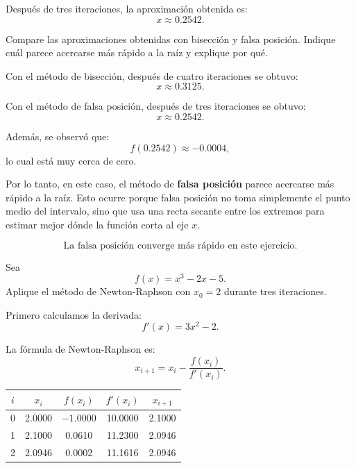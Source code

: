 \documentclass[11pt,respuestas,a4]{aleph-examen}
\begin{document}
\begin{preguntas}
\begin{respuesta}
Después de tres iteraciones, la aproximación obtenida es:
\[
\boxed{x\approx 0.2542}.
\]
\end{respuesta}


\item
Compare las aproximaciones obtenidas con bisección y falsa posición. Indique cuál parece acercarse más rápido a la raíz y explique por qué. 

\begin{respuesta}
Con el método de bisección, después de cuatro iteraciones se obtuvo:
\[
x\approx 0.3125.
\]

Con el método de falsa posición, después de tres iteraciones se obtuvo:
\[
x\approx 0.2542.
\]

Además, se observó que:
\[
f(0.2542)\approx -0.0004,
\]
lo cual está muy cerca de cero.

Por lo tanto, en este caso, el método de \textbf{falsa posición} parece acercarse más rápido a la raíz. Esto ocurre porque falsa posición no toma simplemente el punto medio del intervalo, sino que usa una recta secante entre los extremos para estimar mejor dónde la función corta al eje $x$.

\[
\boxed{\text{La falsa posición converge más rápido en este ejercicio.}}
\]
\end{respuesta}



\item
Sea 
\[
f(x)=x^3-2x-5.
\]
Aplique el método de Newton-Raphson con $x_0=2$ durante tres iteraciones.

\begin{respuesta}
Primero calculamos la derivada:
\[
f'(x)=3x^2-2.
\]

La fórmula de Newton-Raphson es:
\[
x_{i+1}=x_i-\frac{f(x_i)}{f'(x_i)}.
\]

\begin{center}
\renewcommand{\arraystretch}{1.3}
\begin{tabular}{c|c|c|c|c}
\toprule
$i$ & $x_i$ & $f(x_i)$ & $f'(x_i)$ & $x_{i+1}$ \\
\midrule
0 & 2.0000 & $-1.0000$ & 10.0000 & 2.1000 \\
1 & 2.1000 & 0.0610 & 11.2300 & 2.0946 \\
2 & 2.0946 & 0.0002 & 11.1616 & 2.0946 \\
\bottomrule
\end{tabular}
\end{center}


\end{respuesta}
\end{preguntas}
\end{document}
